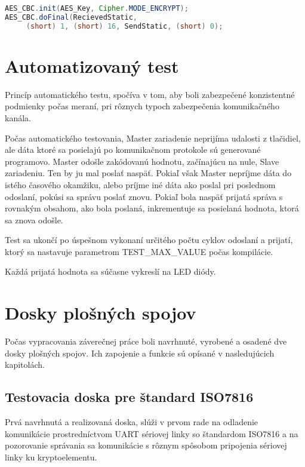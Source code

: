 \documentclass[12pt,a4paper,oneside,openright]{report}
\begin{document}
	\begin{lstlisting}[caption={Zavolanie metódy HW kryptovania.}, label={lst:hwuse}, language=java] 
AES_CBC.init(AES_Key, Cipher.MODE_ENCRYPT);
AES_CBC.doFinal(RecievedStatic,
	 (short) 1, (short) 16, SendStatic, (short) 0);
	\end{lstlisting}
	

\section{Automatizovaný test}
Princíp automatického testu, spočíva v tom, aby boli zabezpečené konzistentné podmienky počas meraní, pri rôznych typoch zabezpečenia komunikačného kanála.

Počas automatického testovania, Master zariadenie neprijíma udalosti z tlačidiel, ale dáta ktoré sa posielajú po komunikačnom protokole sú generované programovo. Master odošle zakódovanú hodnotu, začínajúcu na nule, Slave zariadeniu. Ten by ju mal poslať naspäť. Pokiaľ však Master nepríjme dáta do istého časového okamžiku, alebo príjme iné dáta ako poslal pri poslednom odoslaní, pokúsi sa správu poslať znovu. Pokiaľ bola naspäť prijatá správa s rovnakým obsahom, ako bola poslaná, inkrementuje sa posielaná hodnota, ktorá sa znova odošle.

Test sa ukončí po úspešnom vykonaní určitého počtu cyklov odoslaní a prijatí, ktorý sa nastavuje parametrom TEST\_MAX\_VALUE počas kompilácie.

Každá prijatá hodnota sa súčasne vykreslí na LED diódy.


\newpage

\section{Dosky plošných spojov}
Počas vypracovania záverečnej práce boli navrhnuté, vyrobené a osadené dve dosky plošných spojov. Ich zapojenie a funkcie sú opísané v nasledujúcich kapitolách.

	\subsection{Testovacia doska pre štandard ISO7816} \label{isoboard}
	
	Prvá navrhnutá a realizovaná doska, slúži v prvom rade na odladenie komunikácie prostredníctvom UART sériovej linky so štandardom ISO7816 a na pozorovanie správania sa komunikácie s rôznym spôsobom pripojenia sériovej linky ku kryptoelementu.
	
\end{document}

